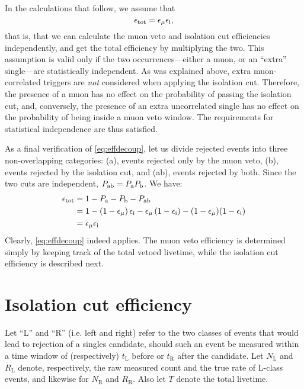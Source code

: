 \documentclass[../thesis.tex]{subfiles}
\begin{document}
In the calculations that follow, we assume that
\begin{equation}
  \label{eq:effdecoup}
  \epsilon_\mathrm{tot} = \epsilon_\mathrm{\mu} \epsilon_\mathrm{i},
\end{equation}
that is, that we can calculate the muon veto and isolation cut efficiencies independently, and get the total efficiency by multiplying the two. This assumption is valid only if the two occurrences---either a muon, or an ``extra'' single---are statistically independent. As was explained above, extra muon-correlated triggers are \emph{not} considered when applying the isolation cut. Therefore, the presence of a muon has no effect on the probability of passing the isolation cut, and, conversely, the presence of an extra uncorrelated single has no effect on the probability of being inside a muon veto window. The requirements for statistical independence are thus satisfied.

As a final verification of \autoref{eq:effdecoup}, let us divide rejected events into three non-overlapping categories: (a), events rejected only by the muon veto, (b), events rejected by the isolation cut, and (ab), events rejected by both. Since the two cuts are independent, $P_\mathrm{ab} = P_\mathrm{a}P_\mathrm{b}$. We have:
\begin{align*}
  \epsilon_\mathrm{tot} &= 1 - P_\mathrm{a} - P_\mathrm{b} - P_\mathrm{ab} \\
        &= 1 - (1-\epsilon_\mathrm{\mu})\,\epsilon_\mathrm{i} - \epsilon_\mathrm{\mu}\,(1-\epsilon_\mathrm{i}) - (1-\epsilon_\mathrm{\mu})(1-\epsilon_\mathrm{i}) \\
        &= \epsilon_\mathrm{\mu} \epsilon_\mathrm{i}
\end{align*}
Clearly, \autoref{eq:effdecoup} indeed applies. The muon veto efficiency is determined simply by keeping track of the total vetoed livetime, while the isolation cut efficiency is described next.


\section{Isolation cut efficiency}
\label{sec:isolcuteff}

\newcommand\NL{\ensuremath{N_{\mathrm{L}}}}
\newcommand\RL{\ensuremath{R_{\mathrm{L}}}}
\newcommand\tL{\ensuremath{t_{\mathrm{L}}}}
\newcommand\NR{\ensuremath{N_{\mathrm{R}}}}
\newcommand\RR{\ensuremath{R_{\mathrm{R}}}}
\newcommand\tR{\ensuremath{t_{\mathrm{R}}}}

Let ``L'' and ``R'' (i.e. left and right) refer to the two classes of events that would lead to rejection of a singles candidate, should such an event be measured within a time window of (respectively) $\tL$ before or $\tR$ after the candidate. Let $\NL$ and $\RL$ denote, respectively, the raw measured count and the true rate of L-class events, and likewise for $\NR$ and $\RR$. Also let $T$ denote the total livetime.
\end{document}
